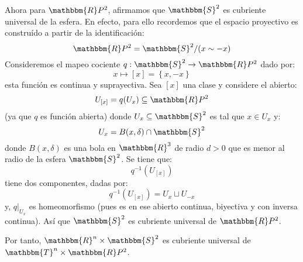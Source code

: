 \documentclass[12pt]{report}
\newcounter{it}
\theoremstyle{largebreak}
\newcommand\cf[3]{\ensuremath{#1:#2\rightarrow#3}}
\newcommand{\bbm}[1]{\ensuremath{\mathbbm{#1}}}
\begin{document}
\begin{sol}
\begin{itemize}
            Ahora para $\bbm{R}P^2$, afirmamos que $\bbm{S}^2$ es cubriente universal de la esfera. En efecto, para ello recordemos que el espacio proyectivo es construído a partir de la identificación:
            \begin{equation*}
                \bbm{R}P^2=\bbm{S}^2/(x\sim-x)
            \end{equation*}
            Consideremos el mapeo cociente $\cf{q}{\bbm{S}^2}{\bbm{R}P^2}$ dado por:
            \begin{equation*}
                x\mapsto[x]=\left\{x,-x\right\}
            \end{equation*}
            esta función es continua y suprayectiva. Sea $[x]$ una clase y considere el abierto:
            \begin{equation*}
                U_{[x]}=q(U_x)\subseteq \bbm{R}P^2 
            \end{equation*}
            (ya que $q$ es función abierta) donde $U_x\subseteq\bbm{S}^2$ es tal que $x\in U_x$ y:
            \begin{equation*}
                U_x=B(x,\delta)\cap\bbm{S}^2
            \end{equation*} 
            donde $B(x,\delta)$ es una bola en $\bbm{R}^3$ de radio $d>0$ que es menor al radio de la esfera $\bbm{S}^2$. Se tiene que:
            \begin{equation*}
                q^{-1}(U_{[x]})
            \end{equation*}
            tiene dos componentes, dadas por:
            \begin{equation*}
                q^{-1}(U_{[x]})=U_x\sqcup U_{ -x}
            \end{equation*}
            y, $q\Big|_{U_x}$ es homeomorfismo (pues es en ese abierto continua, biyectiva y con inversa continua). Así que $\bbm{S}^2$ es cubriente universal de $\bbm{R}P^2$.

            Por tanto, $\bbm{R}^n\times\bbm{S}^2$ es cubriente universal de $\bbm{T}^n\times\bbm{R}P^2$.


\end{itemize}
\end{sol}
\end{document}
